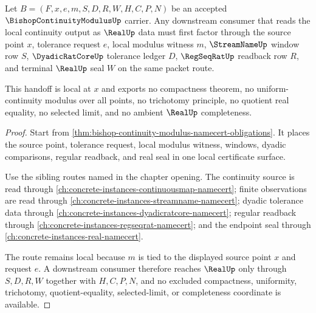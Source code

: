 \begin{theorem}
\label{thm:bishop-continuity-modulus-real-handoff}
Let $B=(F,x,e,m,S,D,R,W,H,C,P,N)$ be an accepted $\BishopContinuityModulusUp$ carrier. Any downstream consumer that reads the local continuity output as $\RealUp$ data must first factor through the source point $x$, tolerance request $e$, local modulus witness $m$, $\StreamNameUp$ window row $S$, $\DyadicRatCoreUp$ tolerance ledger $D$, $\RegSeqRatUp$ readback row $R$, and terminal $\RealUp$ seal $W$ on the same packet route.

This handoff is local at $x$ and exports no compactness theorem, no uniform-continuity modulus over all points, no trichotomy principle, no quotient real equality, no selected limit, and no ambient $\RealUp$ completeness.
\end{theorem}
\begin{proof}
Start from \autoref{thm:bishop-continuity-modulus-namecert-obligations}. It places the source point, tolerance request, local modulus witness, windows, dyadic comparisons, regular readback, and real seal in one local certificate surface.

Use the sibling routes named in the chapter opening. The continuity source is read through \autoref{ch:concrete-instances-continuousmap-namecert}; finite observations are read through \autoref{ch:concrete-instances-streamname-namecert}; dyadic tolerance data through \autoref{ch:concrete-instances-dyadicratcore-namecert}; regular readback through \autoref{ch:concrete-instances-regseqrat-namecert}; and the endpoint seal through \autoref{ch:concrete-instances-real-namecert}.

The route remains local because $m$ is tied to the displayed source point $x$ and request $e$. A downstream consumer therefore reaches $\RealUp$ only through $S,D,R,W$ together with $H,C,P,N$, and no excluded compactness, uniformity, trichotomy, quotient-equality, selected-limit, or completeness coordinate is available.
\end{proof}



